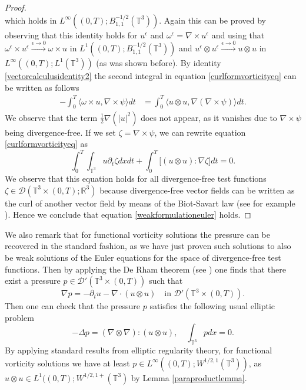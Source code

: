 \documentclass[12pt,a4paper]{article}
\theoremstyle{definition}
\theoremstyle{remark}
\numberwithin{equation}{section}
\begin{document}
\begin{proof}
\begin{equation}
\end{equation}
which holds in $L^\infty ((0,T); B^{-1/2}_{1,1} (\mathbb{T}^3))$. Again this can be proved by observing that this identity holds for $u^\epsilon$ and $\omega^\epsilon = \nabla \times u^\epsilon$ and using that $\omega^\epsilon \times u^\epsilon \xrightarrow[]{\epsilon \rightarrow 0} \omega \times u$ in $L^1 ((0,T); B^{-1/2}_{1,1} (\mathbb{T}^3))$ and $u^\epsilon \otimes u^\epsilon \xrightarrow[]{\epsilon \rightarrow 0} u \otimes u$ in $L^\infty ((0,T); L^1 (\mathbb{T}^3))$ (as was shown before). By identity \eqref{vectorcalculusidentity2} the second integral in equation \eqref{curlformvorticityeq} can be written as follows
\begin{align*}
- \int_0^T \big\langle \omega \times u , \nabla \times \psi \big\rangle dt &= \int_0^T \big\langle u \otimes u , \nabla ( \nabla \times \psi) \big\rangle dt.
\end{align*}
We observe that the term $\frac{1}{2} \nabla (\lvert u \rvert^2)$ does not appear, as it vanishes due to $\nabla \times \psi$ being divergence-free. If we set $\zeta = \nabla \times \psi$, we can rewrite equation \eqref{curlformvorticityeq} as
\begin{equation*}
\int_0^T \int_{\mathbb{T}^3} u \partial_t \zeta dx dt + \int_0^T \big[ (u \otimes u) : \nabla \zeta \big] dt = 0.
\end{equation*}
We observe that this equation holds for all divergence-free test functions $\zeta \in \mathcal{D} (\mathbb{T}^3 \times (0,T);\mathbb{R}^3)$ because divergence-free vector fields can be written as the curl of another vector field by means of the Biot-Savart law (see for example \cite[~Theorem 12.2]{robinsonbook}). Hence we conclude that equation \eqref{weakformulationeuler} holds.
\end{proof}
We also remark that for functional vorticity solutions the pressure can be recovered in the standard fashion, as we have just proven such solutions to also be weak solutions of the Euler equations for the space of divergence-free test functions. Then by applying the De Rham theorem (see \cite[~Chapter 1, Proposition 1.1]{temambook}) one finds that there exist a pressure $p \in \mathcal{D}' (\mathbb{T}^3 \times (0,T))$ such that
\begin{equation*}
\nabla p = - \partial_t u - \nabla \cdot (u \otimes u) \quad \text{in } \mathcal{D}' (\mathbb{T}^3 \times (0,T)).
\end{equation*}
Then one can check that the pressure $p$ satisfies the following usual elliptic problem 
\begin{equation} \label{ellipticproblem}
-\Delta p = (\nabla \otimes \nabla) : (u \otimes u), \quad \int_{\mathbb{T}^3} p dx = 0.
\end{equation}
By applying standard results from elliptic regularity theory, for functional vorticity solutions we have at least $p \in L^\infty ((0,T); W^{1/2,1} (\mathbb{T}^3))$, as $u \otimes u \in L^1 ((0,T); W^{1/2,1+} (\mathbb{T}^3)$ by Lemma \ref{paraproductlemma}.
\end{document}

